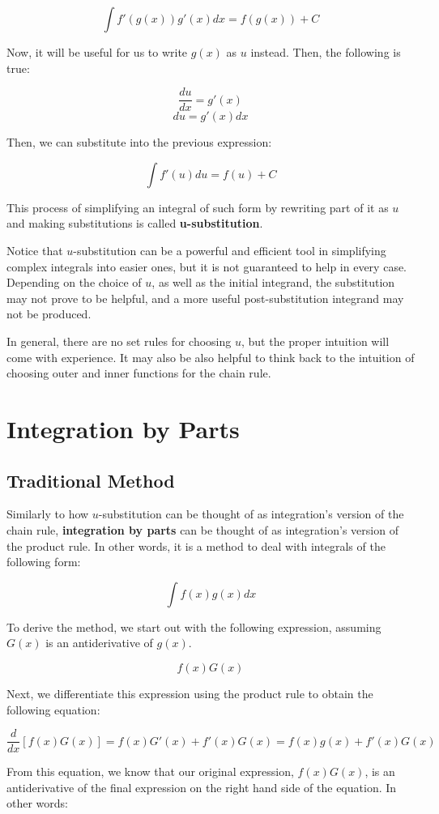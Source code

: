 \documentclass[11pt]{article}
\begin{document}
\[ \int f'(g(x))g'(x) dx = f(g(x)) + C \]

Now, it will be useful for us to write $g(x)$ as $u$ instead. Then, the following is true: 

\[ \frac{du}{dx} = g'(x) \]
\[ du = g'(x) dx\]

Then, we can substitute into the previous expression:

\[ \int f'(u)du = f(u) + C \]

This process of simplifying an integral of such form by rewriting part of it as $u$ and making substitutions is called \textbf{u-substitution}. 

Notice that $u$-substitution can be a powerful and efficient tool in simplifying complex integrals into easier ones, but it is not guaranteed to help in every case. Depending on the choice of $u$, as well as the initial integrand, the substitution may not prove to be helpful, and a more useful post-substitution integrand may not be produced. 

In general, there are no set rules for choosing $u$, but the proper intuition will come with experience. It may also be also helpful to think back to the intuition of choosing outer and inner functions for the chain rule.

\section{Integration by Parts}

\subsection{Traditional Method}
Similarly to how $u$-substitution can be thought of as integration's version of the chain rule, \textbf{integration by parts} can be thought of as integration's version of the product rule. In other words, it is a method to deal with integrals of the following form:

\[ \int f(x)g(x) dx \]

To derive the method, we start out with the following expression, assuming $G(x)$ is an antiderivative of $g(x)$.

\[ f(x)G(x) \]

Next, we differentiate this expression using the product rule to obtain the following equation:

\[ \frac{d}{dx}[f(x)G(x)] = f(x)G'(x) + f'(x)G(x)  = f(x)g(x) + f'(x)G(x)\]

From this equation, we know that our original expression, $f(x)G(x)$, is an antiderivative of the final expression on the right hand side of the equation. In other words:
\end{document}
